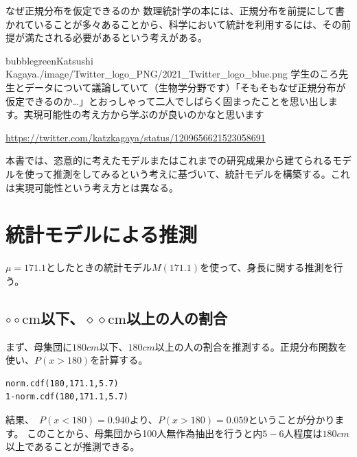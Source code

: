 \begin{SMbox}{なぜ正規分布を仮定できるのか}
  数理統計学の本には、正規分布を前提にして書かれていることが多々あることから、科学において統計を利用するには、その前提が満たされる必要があるという考えがある。%

  \begin{rightbubbles}{bubblegreen}{Katsushi Kagaya}{./image/Twitter_logo_PNG/2021_Twitter_logo_blue.png}
  学生のころ先生とデータについて議論していて（生物学分野です）「そもそもなぜ正規分布が仮定できるのか…」とおっしゃって二人でしばらく固まったことを思い出します。実現可能性の考え方から学ぶのが良いのかなと思います
      \begin{flushright} 
          \small	\url{https://twitter.com/katzkagaya/status/1209656621523058691}
      \end{flushright}    
  \end{rightbubbles}

  本書では、恣意的に考えたモデルまたはこれまでの研究成果から建てられるモデルを使って推測をしてみるという考えに基づいて、統計モデルを構築する。これは実現可能性という考え方とは異なる。
\end{SMbox}



\section{統計モデルによる推測}
$\mu=171.1$としたときの統計モデル$M(171.1)$を使って、身長に関する推測を行う。

\subsection{ $\circ\circ \mathrm{cm}$以下、$\diamond\diamond \mathrm{cm}$以上の人の割合}
まず、母集団に$180cm$以下、$180cm$以上の人の割合を推測する。正規分布関数を使い、$P(x>180)$を計算する。

\begin{lstlisting}
norm.cdf(180,171.1,5.7)
1-norm.cdf(180,171.1,5.7)
\end{lstlisting}
結果、　$P(x<180)=0.940$より、$P(x>180)=0.059$ということが分かります。
このことから、母集団から100人無作為抽出を行うと内$5-6$人程度は$180cm$以上であることが推測できる。


